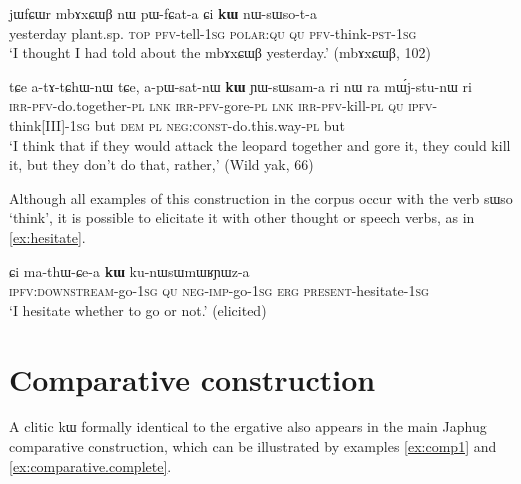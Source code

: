 \documentclass[oldfontcommands,oneside,a4paper,11pt]{article}
\newcommand{\ipa}[1]{{\phon #1}} %
\begin{document}
    \begin{exe} 
 \ex \label{ex:kW.nWsWsota}
\gll 
    \ipa{jɯfɕɯr} 	\ipa{mbɤxɕɯβ} 	\ipa{nɯ} 	\ipa{pɯ-fɕat-a} 	\ipa{ɕi} 	\ipa{\textbf{kɯ}} 	\ipa{nɯ-sɯso-t-a} \\
    yesterday plant.sp. \textsc{top} \textsc{pfv}-tell-\textsc{1sg} \textsc{polar:qu} \textsc{qu} \textsc{pfv}-think-\textsc{pst-1sg} \\
    \glt `I thought I had told about the   \ipa{mbɤxɕɯβ} yesterday.' (mbɤxɕɯβ, 102)
 \end{exe}  
 

    \begin{exe} 
 \ex \label{ex:kW.YWsWsama}
\gll \ipa{a-kɤ-nɯtshɤβ-nɯ} 	\ipa{tɕe} 	\ipa{a-tɤ-tɕhɯ-nɯ} 	\ipa{tɕe,} 	\ipa{a-pɯ-sat-nɯ} 	\ipa{\textbf{kɯ}} 	\ipa{ɲɯ-sɯsam-a} 	\ipa{ri}  \ipa{nɯ} \ipa{ra} 	\ipa{mɯ́j-stu-nɯ} 	\ipa{ri} \\
\textsc{irr-pfv}-do.together-\textsc{pl} \textsc{lnk} \textsc{irr-pfv}-gore-\textsc{pl} \textsc{lnk } \textsc{irr-pfv}-kill-\textsc{pl} \textsc{qu} \textsc{ipfv}-think[III]-\textsc{1sg} but \textsc{dem} \textsc{pl} \textsc{neg:const}-do.this.way-\textsc{pl}  but \\
\glt `I think that if they would attack the leopard together and gore it, they could kill it, but they don't do that, rather,' (Wild yak, 66)
 \end{exe} 
 
 
Although all examples of this construction in the corpus occur with the verb \ipa{sɯso} `think', it is possible to elicitate it with other thought or speech verbs, as in \ref{ex:hesitate}.


 \begin{exe} 
 \ex \label{ex:hesitate}
\gll \ipa{chɯ-ɕe-a}   	\ipa{ɕi}   	\ipa{ma-thɯ-ɕe-a}   	\ipa{\textbf{kɯ}}   	\ipa{ku-nɯsɯmɯʁɲɯz-a}          \\
\textsc{ipfv:downstream}-go-\textsc{1sg} \textsc{qu} \textsc{neg}-\textsc{imp}-go-\textsc{1sg} \textsc{erg} \textsc{present}-hesitate-\textsc{1sg}   \\
 \glt  `I hesitate whether to go or not.' (elicited)
\end{exe}  

 

\section{Comparative construction} \label{sec:comparative}

A clitic \ipa{kɯ} formally identical to the ergative also appears in the main Japhug comparative construction, which can be illustrated by   examples \ref{ex:comp1} and \ref{ex:comparative.complete}.
\end{document}
